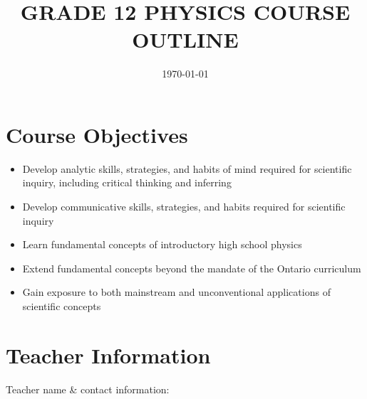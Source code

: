 \documentclass{../oss-handout}
\title{GRADE 12 PHYSICS COURSE OUTLINE}
\author{}
\date{\today}
\begin{document}
\thispagestyle{title}
\gentitle



\section{Course Objectives}
\begin{itemize}[nosep]
\item Develop analytic skills, strategies, and habits of mind required for
  scientific inquiry, including critical thinking and inferring
\item Develop communicative skills, strategies, and habits required for
  scientific inquiry
\item Learn fundamental concepts of introductory high school physics
\item Extend fundamental concepts beyond the mandate of the Ontario curriculum
\item Gain exposure to both mainstream and unconventional applications of
  scientific concepts
\end{itemize}



\section{Teacher Information}
Teacher name \& contact information: \underline{\hspace{4.5in}}
\end{document}
